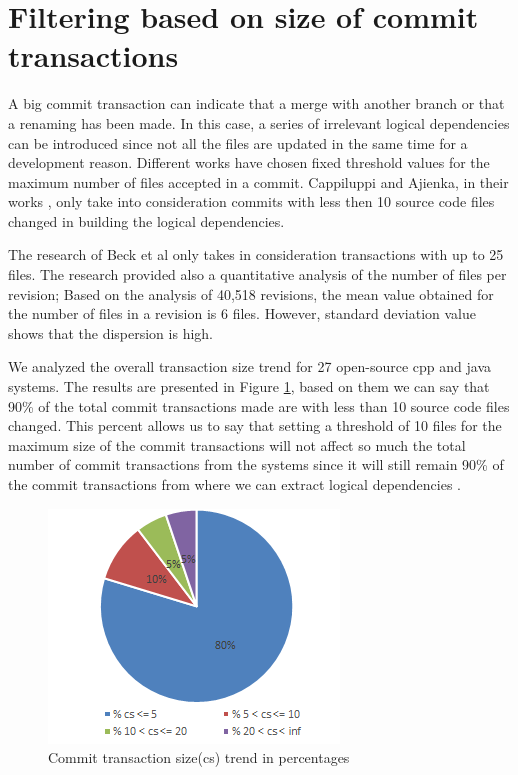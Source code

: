 \documentclass[12pt]{mitthesis}
\begin{document}
\section{Filtering based on size of commit transactions}
\label{sec:filtercommit}
A big commit transaction can indicate that a merge with another branch or that a renaming has been made.
In this case, a series of irrelevant logical dependencies can be introduced since not all the files are updated in the same time for a development reason. Different works have chosen fixed threshold values for the maximum number of files accepted in a commit. Cappiluppi and Ajienka, in their works \cite{DBLP:journals/jss/AjienkaC17}, \cite{DBLP:journals/ese/AjienkaCC18} only take into consideration commits with less then 10 source code files changed in building the logical dependencies.

The research of Beck et al \cite{Beck:2011:CMC:2025113.2025162} only takes in consideration transactions with up to 25 files. The research \cite{Oliva:2011:ISL:2067853.2068086} provided also a quantitative analysis of the number of files per revision; Based on the analysis of 40,518 revisions, the mean value obtained for the number of files in a revision is 6 files. However, standard deviation value shows that the dispersion is high. 

We analyzed the overall transaction size trend for 27 open-source cpp and java systems. The results are presented in Figure \ref{fig:fig_cs}, based on them we can say that 90\% of the total commit transactions made are with less than 10 source code files changed. This percent allows us to say that setting a threshold of 10 files for the maximum size of the commit transactions will not affect so much the total number of commit transactions from the systems since it will still remain 90\% of the commit transactions from where we can extract logical dependencies \cite{DepSACI}.


\begin{figure}[h]
\centering
\includegraphics{fig_cs.png}
\caption{Commit transaction size(cs) trend in percentages}
\label{fig:fig_cs}
\centering
\end{figure}
\end{document}
